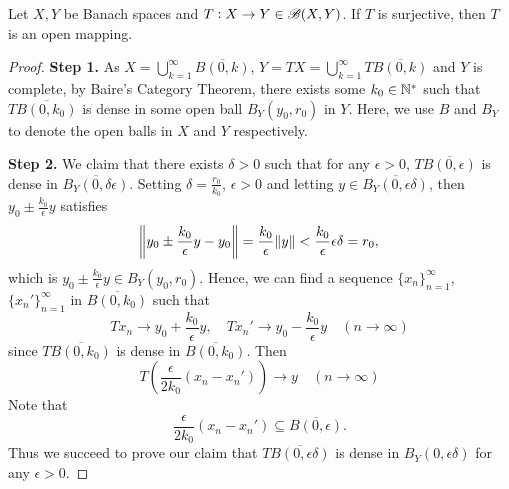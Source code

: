 \begin{thm}
Let $X, Y$ be Banach spaces and $T: X \to Y \in \mathscr{B}(X, Y)$. 
If $T$ is surjective, then $T$ is an open mapping. 
\end{thm}
\begin{proof}
\textbf{Step 1. }
As $X = \bigcup_{k=1}^\infty \overline{B(0, k)}$, $Y = TX = \bigcup_{k=1}
^\infty T\overline{B(0, k)}$ and $Y$ is complete, by Baire's Category 
Theorem, there exists some $k_0 \in \mathbb{N}^\ast$ such that $T\overline{B(0, k_0)}$ 
is dense in some open ball $B_Y(y_0, r_0)$ in $Y$. 
Here, we use $B$ and $B_Y$ to denote the open balls in $X$ and $Y$ 
respectively. 

\textbf{Step 2. }
We claim that there exists $\delta > 0$ such that for any $\epsilon > 0$, 
$T \overline{B(0, \epsilon)}$ is dense in $\overline{B_Y(0, \delta 
\epsilon)}$. 
Setting $\delta = \frac{r_0}{k_0}$, $\epsilon > 0$ and letting $y \in 
\overline{B_Y(0, \epsilon \delta)}$, then $y_0 \pm \frac{k_0}{\epsilon} y$ 
satisfies 
\begin{equation*}
    \norm{y_0 \pm \frac{k_0}{\epsilon} y - y_0} 
    = \frac{k_0}{\epsilon} \norm{y} 
    < \frac{k_0}{\epsilon} \epsilon \delta = r_0, 
\end{equation*}
which is $y_0 \pm \frac{k_0}{\epsilon} y \in B_Y(y_0, r_0)$. 
Hence, we can find a sequence $\{ x_n \}_{n=1}^{\infty}$, 
$\{ x_n' \}_{n=1}^{\infty}$ in $\overline{B(0, k_0)}$ such that 
\begin{equation*}
    Tx_n \to y_0 + \frac{k_0}{\epsilon} y, \quad 
    Tx_n' \to y_0 - \frac{k_0}{\epsilon} y \quad (n \to \infty)
\end{equation*}
since $T \overline{B(0, k_0)}$ is dense in $\overline{B(0, k_0)}$. 
Then 
\begin{equation*}
    T \left( \frac{\epsilon}{2k_0} (x_n - x_n') \right) \to y 
    \quad (n \to \infty)
\end{equation*}
Note that 
\begin{equation*}
    \frac{\epsilon}{2k_0}(x_n - x_n') \subseteq \overline{B(0, \epsilon)}.
\end{equation*}
Thus we succeed to prove our claim that $T \overline{B(0, \epsilon \delta)}$ 
is dense in $B_Y(0, \epsilon \delta)$ for any $\epsilon > 0$. 


\end{proof}
